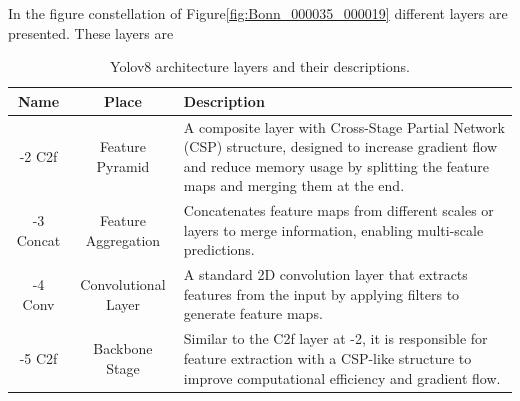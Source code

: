 In the figure constellation of Figure\ref{fig:Bonn_000035_000019} different layers are presented.
These layers are

\begin{table}[h]
    \centering
    \begin{tabular}{|c|c|p{10cm}|}
        \hline
        \textbf{Name} & \textbf{Place} & \textbf{Description} \\
         \hline
         -2 C2f  & Feature Pyramid & A composite layer with Cross-Stage Partial Network (CSP) structure, designed to increase gradient flow and reduce memory usage by splitting the feature maps and merging them at the end. \\
         \hline
         -3 Concat & Feature Aggregation & Concatenates feature maps from different scales or layers to merge information, enabling multi-scale predictions. \\
         \hline
         -4 Conv & Convolutional Layer & A standard 2D convolution layer that extracts features from the input by applying filters to generate feature maps. \\
         \hline
         -5 C2f  & Backbone Stage & Similar to the C2f layer at -2, it is responsible for feature extraction with a CSP-like structure to improve computational efficiency and gradient flow. \\
         \hline
    \end{tabular}
    \caption{Yolov8 architecture layers and their descriptions.}
    \label{tab:yolov8_layers}
\end{table}

